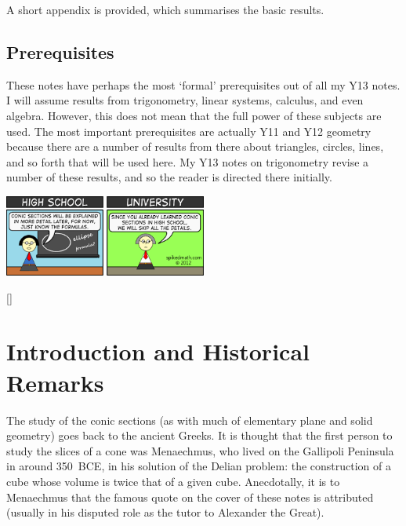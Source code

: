 \documentclass[a4paper,leqno,9pt]{article}
\theoremstyle{exercise}
\theoremstyle{plain}
\theoremstyle{definition}
\theoremstyle{remark}
\begin{document}
A short appendix is provided, which summarises the basic results.

\subsection*{Prerequisites}
These notes have perhaps the most `formal' prerequisites out of all my Y13 notes. I will assume results from trigonometry, linear systems, calculus, and
even algebra. However, this does not mean that the full power of these subjects are used. The most important prerequisites are actually Y11 and Y12
geometry because there are a number of results from there about triangles, circles, lines, and so forth that will be used here. My Y13 notes on trigonometry
revise a number of these results, and so the reader is directed there initially.

\begin{center}
  \includegraphics[width=0.5\textwidth]{conics}
\end{center}

[{\titlerule[0.8pt]}]
\let\oldsection\section
\renewcommand\section{\clearpage\oldsection}
\section{Introduction and Historical Remarks}
The study of the conic sections (as with much of elementary plane and solid geometry) goes back to the ancient Greeks. It is
thought that the first person to study the slices of a cone was Menaechmus, who lived on the Gallipoli Peninsula in around 350~BCE,
in his solution of the Delian problem: the construction of a cube whose volume is twice that of a given cube. Anecdotally, it is to
Menaechmus that the famous quote on the cover of these notes is attributed (usually in his disputed role as the tutor to Alexander the Great).
\end{document}
